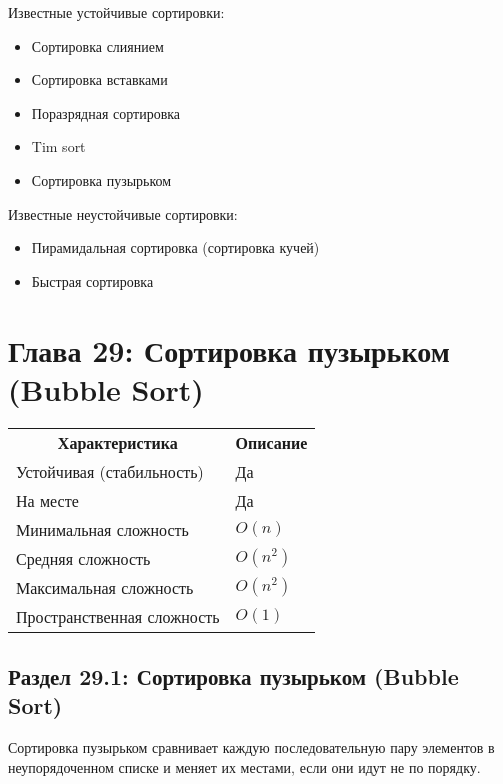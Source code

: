 \vspace{\baselineskip}

Известные устойчивые сортировки:

\begin{itemize}
\item Сортировка слиянием
\item Сортировка вставками
\item Поразрядная сортировка
\item Tim sort
\item Сортировка пузырьком
\end{itemize}

Известные неустойчивые сортировки:

\begin{itemize}
\item Пирамидальная сортировка (сортировка кучей)
\item Быстрая сортировка
\end{itemize}

\chapter*{Глава 29: Сортировка пузырьком (Bubble Sort)}

\begin{tabular}{ll}
\multicolumn{1}{c}{\textbf{Характеристика}}& \multicolumn{1}{c}{\textbf{Описание}} \\[5pt]
\ttfamily Устойчивая (стабильность) & Да \\[5pt]
\ttfamily На месте & Да \\[5pt]
\ttfamily Минимальная сложность & $O(n)$ \\[5pt]
\ttfamily Средняя сложность & $O(n^2)$ \\[5pt]
\ttfamily Максимальная сложность & $O(n^2)$ \\[5pt]
\ttfamily Пространственная сложность & $O(1)$ \\[5pt]
\end{tabular}

\section*{Раздел 29.1: Сортировка пузырьком (Bubble Sort)}

Сортировка пузырьком сравнивает каждую последовательную пару элементов в неупорядоченном списке и меняет их местами, если они идут не по порядку.

\vspace{\baselineskip}


